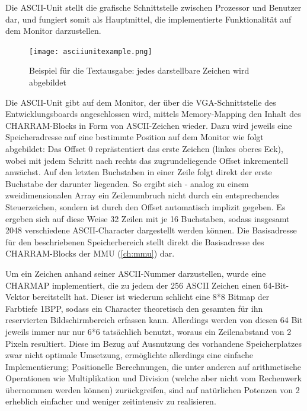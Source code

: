 
\label{ch:asciiunit}
Die ASCII-Unit stellt die grafische Schnittstelle zwischen Prozessor und Benutzer dar, und fungiert somit als Hauptmittel, die implementierte Funktionalit\"at auf dem Monitor darzustellen.

\begin{figure}[!htbp]
	\centering
	\label{fig:exampletext}
	\texttt{[image: asciiunitexample.png]}
	\caption[Beispiel f\"ur die Textausgabe]{Beispiel f\"ur die Textausgabe: jedes darstellbare Zeichen wird abgebildet}
\end{figure}


Die ASCII-Unit gibt auf dem Monitor, der \"uber die VGA-Schnittstelle des Entwicklungsboards angeschlossen wird, mittels Memory-Mapping den Inhalt des CHARRAM-Blocks in Form von ASCII-Zeichen wieder. Dazu wird jeweils eine Speicheradresse auf eine bestimmte Position auf dem Monitor wie folgt abgebildet: Das Offset 0 repr\"astentiert das erste Zeichen (linkes oberes Eck), wobei mit jedem Schritt nach rechts das zugrundeliegende Offset inkrementell anw\"achst. Auf den letzten Buchstaben in einer Zeile folgt direkt der erste Buchstabe der darunter liegenden. So ergibt sich - analog zu einem zweidimensionalen Array ein Zeilenumbruch nicht durch ein entsprechendes Steuerzeichen, sondern ist durch den Offset automatisch implizit gegeben. Es ergeben sich auf diese Weise 32 Zeilen mit je 16 Buchstaben, sodass insgesamt 2048 verschiedene ASCII-Character dargestellt werden k\"onnen. Die Basisadresse f\"ur den beschriebenen Speicherbereich stellt direkt die Basisadresse des CHARRAM-Blocks der MMU (\ref{ch:mmu}) dar.

Um ein Zeichen anhand seiner ASCII-Nummer darzustellen, wurde eine CHARMAP implementiert, die zu jedem der 256 ASCII Zeichen einen 64-Bit-Vektor bereitstellt hat. Dieser ist wiederum schlicht eine 8*8 Bitmap der Farbtiefe 1BPP, sodass ein Character theoretisch den gesamten f\"ur ihn reservierten Bildschirmbereich erfassen kann. Allerdings  werden von diesen 64 Bit jeweils immer nur nur 6*6 tats\"achlich benutzt, woraus ein Zeilenabstand von 2 Pixeln resultiert. Diese im Bezug auf Ausnutzung des vorhandene Speicherplatzes zwar nicht optimale Umsetzung, erm\"oglichte allerdings eine einfache Implementierung; Positionelle Berechnungen, die unter anderen auf arithmetische Operationen wie Multiplikation und Division (welche aber nicht vom Rechenwerk \"ubernommen werden k\"onnen) zur\"uckgreifen, sind auf nat\"urlichen Potenzen von 2 erheblich einfacher und weniger zeitintensiv zu realisieren.

